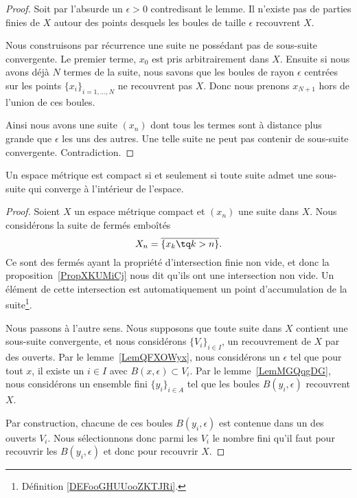 \begin{proof}
	Soit par l'absurde un \( \epsilon>0\) contredisant le lemme. Il n'existe pas de parties finies de \( X\) autour des points desquels les boules de taille \( \epsilon\) recouvrent \( X\).

	Nous construisons par récurrence une suite ne possédant pas de sous-suite convergente. Le premier terme, \( x_0\) est pris arbitrairement dans \( X\). Ensuite si nous avons déjà \( N\) termes de la suite, nous savons que les boules de rayon \( \epsilon\) centrées sur les points \( \{ x_i \}_{i=1,\ldots, N}\) ne recouvrent pas \( X\). Donc nous prenons \( x_{N+1}\) hors de l'union de ces boules.

	Ainsi nous avons une suite \( (x_n)\) dont tous les termes sont à distance plus grande que \( \epsilon\) les uns des autres. Une telle suite ne peut pas contenir de sous-suite convergente. Contradiction.
\end{proof}

\begin{theorem}\label{ThoBWFTXAZNH}
	Un espace métrique est compact si et seulement si toute suite admet une sous-suite qui converge à l'intérieur de l'espace.
\end{theorem}

\begin{proof}
	Soient \( X\) un espace métrique compact et \( (x_n)\) une suite dans \( X\). Nous considérons la suite de fermés emboîtés
	\begin{equation}
		X_n=\overline{ \{ x_k\tq k>n \} }.
	\end{equation}
	Ce sont des fermés ayant la propriété d'intersection finie non vide, et donc la proposition~\ref{PropXKUMiCj} nous dit qu'ils ont une intersection non vide. Un élément de cette intersection est automatiquement un point d'accumulation de la suite\footnote{Définition \ref{DEFooGHUUooZKTJRi}.}.

	Nous passons à l'autre sens. Nous supposons que toute suite dans \( X\) contient une sous-suite convergente, et nous considérons \( \{ V_i \}_{i\in I}\), un recouvrement de \( X\) par des ouverts. Par le lemme~\ref{LemQFXOWyx}, nous considérons un \( \epsilon\) tel que pour tout \( x\), il existe un \( i\in I\) avec \( B(x,\epsilon)\subset V_i\). Par le lemme~\ref{LemMGQqgDG}, nous considérons un ensemble fini \( \{ y_i \}_{i\in A}\) tel que les boules \( B(y_i,\epsilon)\) recouvrent \( X\).

	Par construction, chacune de ces boules \( B(y_i,\epsilon)\) est contenue dans un des ouverts \( V_i\). Nous sélectionnons donc parmi les \( V_i\) le nombre fini qu'il faut pour recouvrir les \( B(y_i,\epsilon)\) et donc pour recouvrir \( X\).
\end{proof}


